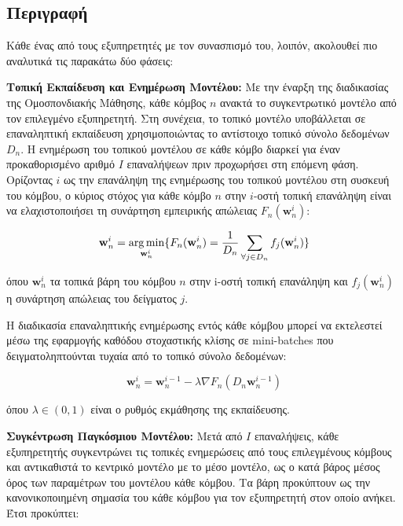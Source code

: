 \subsection{Περιγραφή}

Κάθε ένας από τους εξυπηρετητές με τον συνασπισμό του, λοιπόν, ακολουθεί πιο αναλυτικά τις παρακάτω δύο φάσεις:

\textbf{Τοπική Εκπαίδευση και Ενημέρωση Μοντέλου:} Με την έναρξη της διαδικασίας της Ομοσπονδιακής Μάθησης, κάθε κόμβος $n$ ανακτά το συγκεντρωτικό μοντέλο από τον επιλεγμένο εξυπηρετητή. Στη συνέχεια, το τοπικό μοντέλο υποβάλλεται σε επαναληπτική εκπαίδευση χρησιμοποιώντας το αντίστοιχο τοπικό σύνολο δεδομένων $D_n$. Η ενημέρωση του τοπικού μοντέλου σε κάθε κόμβο διαρκεί για έναν προκαθορισμένο αριθμό $I$ επαναλήψεων πριν προχωρήσει στη επόμενη φάση. Ορίζοντας $i$ ως την επανάληψη της ενημέρωσης του τοπικού μοντέλου στη συσκευή του κόμβου, ο κύριος στόχος για κάθε κόμβο $n$ στην $i$-οστή τοπική επανάληψη είναι να ελαχιστοποιήσει τη συνάρτηση εμπειρικής απώλειας $F_n(\mathbf{w}_n^i)$:

\vspace{-5pt}

\begin{equation}
   \mathbf{w}_n^i=\operatorname*{arg\,min}\limits_{\mathbf{w}_n^i} \{F_n(\mathbf{w}_n^i)=\frac{1}{D_n}\sum\limits_{\forall j\in D_n}f_j(\mathbf{w}_n^i)\}
    \label{eq13}
\end{equation}

\vspace{-5pt}

\noindent
όπου $\mathbf{w}_n^i$ τα τοπικά βάρη του κόμβου $n$ στην i-οστή τοπική επανάληψη και $f_j(\mathbf{w}_n^i)$ η συνάρτηση απώλειας του δείγματος $j$.

Η διαδικασία επαναληπτικής ενημέρωσης εντός κάθε κόμβου μπορεί να εκτελεστεί μέσω της εφαρμογής καθόδου στοχαστικής κλίσης σε mini-batches που δειγματοληπτούνται τυχαία από το τοπικό σύνολο δεδομένων:

\vspace{-5pt}
\begin{equation}
   \mathbf{w}_n^i=\mathbf{w}_n^{i-1}-\lambda \nabla F_n(D_n \mathbf{w}_n^{i-1})
    \label{eq14}
\end{equation}

\vspace{-5pt}

\noindent
όπου $\lambda \in (0,1)$ είναι ο ρυθμός εκμάθησης της εκπαίδευσης.

\textbf{Συγκέντρωση Παγκόσμιου Μοντέλου:} Μετά από $I$ επαναλήψεις, κάθε εξυπηρετητής συγκεντρώνει τις τοπικές ενημερώσεις από τους επιλεγμένους κόμβους και αντικαθιστά το κεντρικό μοντέλο με το μέσο μοντέλο, ως ο κατά βάρος μέσος όρος των παραμέτρων του μοντέλου κάθε κόμβου. Τα βάρη προκύπτουν ως την κανονικοποιημένη σημασία του κάθε κόμβου για τον εξυπηρετητή στον οποίο ανήκει. Έτσι προκύπτει:

